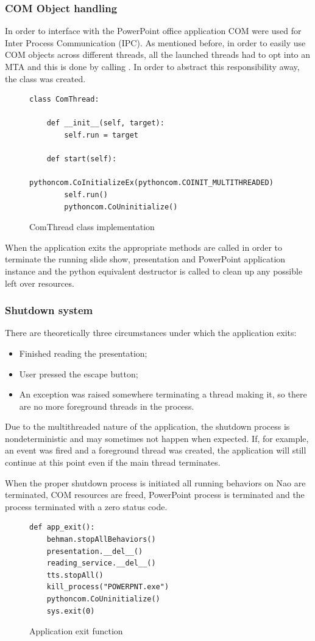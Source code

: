 \documentclass[12pt, fleqn, a4paper]{article}
\begin{document}
\subsubsection{COM Object handling}
In order to interface with the PowerPoint office application COM were used for Inter Process Communication (IPC). As mentioned before, in order to easily use COM objects across different threads, all the launched threads had to opt into an MTA and this is done 
by calling  \citep{pywin32}. In order to abstract this responsibility away, the  class was created.
\begin{figure}[H]
	\centering
	\begin{verbatim}
class ComThread:

    def __init__(self, target):
        self.run = target

    def start(self):
        pythoncom.CoInitializeEx(pythoncom.COINIT_MULTITHREADED)
        self.run()
        pythoncom.CoUninitialize()
	\end{verbatim}
	\caption{ComThread class implementation}
\end{figure}
When the application exits the appropriate methods are called in order to terminate the running slide show, presentation and PowerPoint application instance and the python equivalent destructor is called to clean up any possible left over resources.
\subsubsection{Shutdown system}
There are theoretically three circumstances under which the application exits:
\begin{itemize}
	\item Finished reading the presentation;
	\item User pressed the escape button;
	\item An exception was raised somewhere terminating a thread making it, so there are no more foreground threads in the process.
\end{itemize}
Due to the multithreaded nature of the application, the shutdown process is nondeterministic and may sometimes not happen when expected. If, for example, an event was fired and a foreground thread was created, the application will still continue at this point even if the main thread terminates.\par
When the proper shutdown process is initiated all running behaviors on Nao are terminated, COM resources are freed, PowerPoint process is terminated and the process terminated with a zero status code.
\begin{figure}[H]
	\centering
	\begin{verbatim}
def app_exit():
    behman.stopAllBehaviors()
    presentation.__del__()
    reading_service.__del__()
    tts.stopAll()
    kill_process("POWERPNT.exe")
    pythoncom.CoUninitialize()
    sys.exit(0)
	\end{verbatim}
	\caption{Application exit function}
\end{figure}
\end{document}
